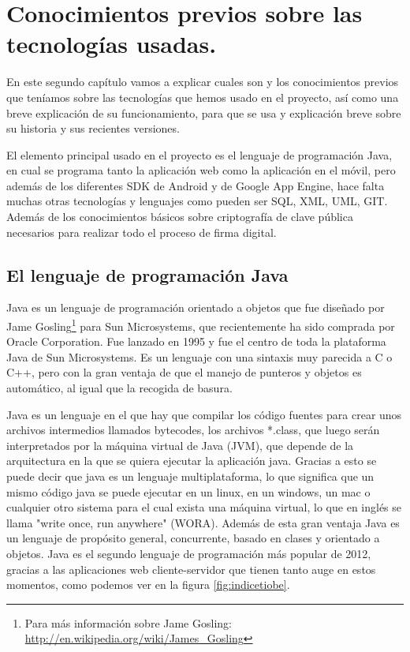 \chapter[Conocimientos previos]{Conocimientos previos sobre las tecnologías usadas.}\label{cap:conocimientos}

En este segundo capítulo vamos a explicar cuales son y los conocimientos previos que teníamos sobre las tecnologías que hemos usado en el proyecto, así como una breve explicación de su funcionamiento, para que se usa y explicación breve sobre su historia y sus recientes versiones.

El elemento principal usado en el proyecto es el lenguaje de programación Java, en cual se programa tanto la aplicación web como la aplicación en el móvil, pero además de los diferentes SDK de Android y de Google App Engine, hace falta muchas otras tecnologías y lenguajes como pueden ser SQL, XML, UML, GIT. Además de los conocimientos básicos sobre criptografía de clave pública necesarios para realizar todo el proceso de firma digital.   

\section{El lenguaje de programación Java}

Java es un lenguaje de programación orientado a objetos que fue diseñado por Jame Gosling\footnote{Para más información sobre Jame Gosling: \url{http://en.wikipedia.org/wiki/James\_Gosling}} para Sun Microsystems, que recientemente ha sido comprada por Oracle Corporation. Fue lanzado en 1995 y fue el centro de toda la plataforma Java de Sun Microsystems. Es un lenguaje con una sintaxis muy parecida a C o C++, pero con la gran ventaja de que el manejo de punteros y objetos es automático, al igual que la recogida de basura.

Java es un lenguaje en el que hay que compilar los código fuentes para crear unos archivos intermedios llamados bytecodes, los archivos *.class, que luego serán interpretados por la máquina virtual de Java (JVM), que depende de la arquitectura en la que se quiera ejecutar la aplicación java. Gracias a esto se puede decir que java es un lenguaje multiplataforma, lo que significa que un mismo código java se puede ejecutar en un linux, en un windows, un mac o cualquier otro sistema para el cual exista una máquina virtual, lo que en inglés se llama "write once, run anywhere" (WORA). Además de esta gran ventaja Java es un lenguaje de propósito general, concurrente, basado en clases y orientado a objetos. Java es el segundo lenguaje de programación más popular de 2012, gracias a las aplicaciones web cliente-servidor que tienen tanto auge en estos momentos, como podemos ver en la figura \ref{fig:indicetiobe}.

